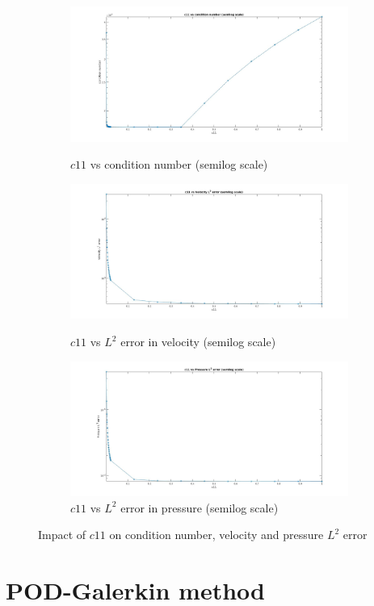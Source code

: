\documentclass[a4paper,oneside,openright,spanish,english]{book}
\begin{document}
\begin{figure}
\begin{subfigure}{\textwidth}	
  \includegraphics[width=0.8\linewidth]{c11_condition_number_semilog.jpg}
  \caption{$c11$ vs condition number (semilog scale)} 
  \label{$c11$ vs Condition number_semilog}
  \includegraphics[width=0.8\linewidth]{c11_velocity_l2_error_semilog.jpg}
  \caption{$c11$ vs $L^2$ error in velocity (semilog scale)} 
  \label{c11_L2_error_velocity_semilog}
  \includegraphics[width=0.8\linewidth]{c11_pressure_l2_error_semilog.jpg}
  \caption{$c11$ vs $L^2$ error in pressure (semilog scale)} 
  \label{c11_L2_error_pressure_semilog}
\end{subfigure}
\caption{Impact of $c11$ on condition number, velocity and pressure $L^2$ error}
\label{all_c11_figure_semilog}
\end{figure}

\section{POD-Galerkin method}
\end{document}
